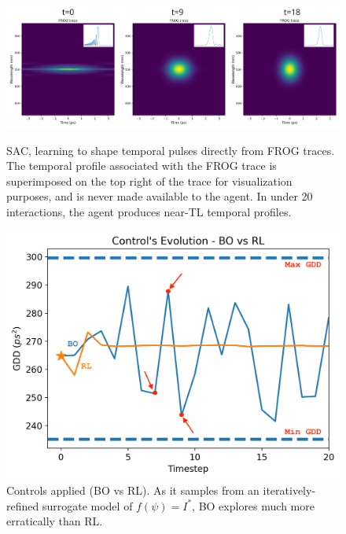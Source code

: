 \begin{figure}
    \centering
    \begin{minipage}{0.65\textwidth}
        \centering
        \includegraphics[width=\linewidth]{images/frogopt.png}
        \caption{SAC, learning to shape temporal pulses directly from FROG traces. The temporal profile associated with the FROG trace is superimposed on the top right of the trace for visualization purposes, and is never made available to the agent. In under 20 interactions, the agent produces near-TL temporal profiles.}
        \label{fig:frog_opt}
    \end{minipage}
    \hfill
    \begin{minipage}{0.30\textwidth}
        \centering
        \includegraphics[width=\linewidth]{images/machinesafety.png}
        \caption{Controls applied (BO vs RL). As it samples from an iteratively-refined surrogate model of \( f(\psi)=I^*\), BO explores much more erratically than RL.}
        \label{fig:bayes_vs_rl}
    \end{minipage}
\end{figure}

